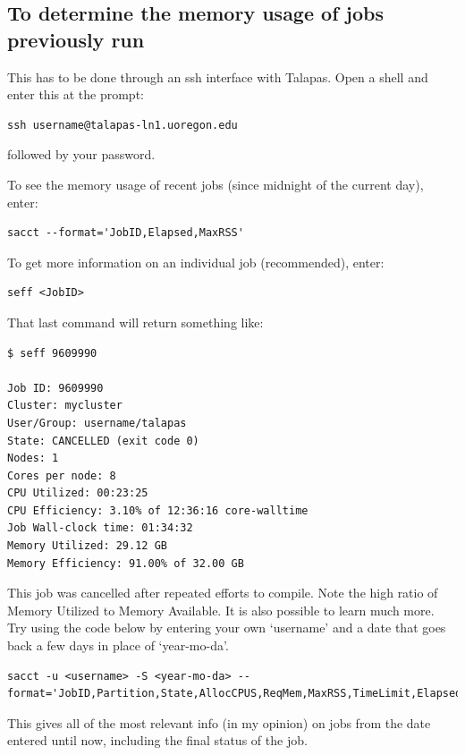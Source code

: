 \documentclass[]{book}
\begin{document}
\hypertarget{to-determine-the-memory-usage-of-jobs-previously-run}{%
\subsection{To determine the memory usage of jobs previously run}\label{to-determine-the-memory-usage-of-jobs-previously-run}}

This has to be done through an ssh interface with Talapas. Open a shell and enter this at the prompt:

\begin{verbatim}
ssh username@talapas-ln1.uoregon.edu
\end{verbatim}

followed by your password.

To see the memory usage of recent jobs (since midnight of the current day), enter:

\begin{verbatim}
sacct --format='JobID,Elapsed,MaxRSS'
\end{verbatim}

To get more information on an individual job (recommended), enter:

\begin{verbatim}
seff <JobID>
\end{verbatim}

That last command will return something like:

\begin{verbatim}
$ seff 9609990

Job ID: 9609990
Cluster: mycluster
User/Group: username/talapas
State: CANCELLED (exit code 0)
Nodes: 1
Cores per node: 8
CPU Utilized: 00:23:25
CPU Efficiency: 3.10% of 12:36:16 core-walltime
Job Wall-clock time: 01:34:32
Memory Utilized: 29.12 GB
Memory Efficiency: 91.00% of 32.00 GB
\end{verbatim}

This job was cancelled after repeated efforts to compile. Note the high ratio of Memory Utilized to Memory Available. It is also possible to learn much more. Try using the code below by entering your own `username' and a date that goes back a few days in place of `year-mo-da'.

\begin{verbatim}
sacct -u <username> -S <year-mo-da> --format='JobID,Partition,State,AllocCPUS,ReqMem,MaxRSS,TimeLimit,Elapsed'
\end{verbatim}

This gives all of the most relevant info (in my opinion) on jobs from the date entered until now, including the final status of the job.
\end{document}

